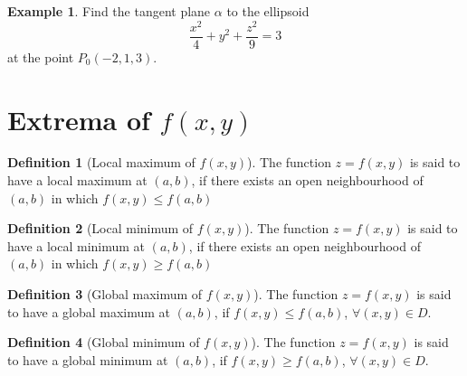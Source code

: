 \documentclass[fleqn, a4paper, 12pt]{article}
\theoremstyle{definition}
\newtheorem{example}{Example}
\newtheorem{definition}{Definition}
\theoremstyle{theorem}
\theoremstyle{remark}
\begin{document}
\begin{example}
	Find the tangent plane $\alpha$ to the ellipsoid 
	\begin{equation*}
		\dfrac{x^2}{4} + y^2 + \dfrac{z^2}{9} = 3
	\end{equation*}
	at the point $P_0 (-2, 1, 3)$.
\end{example}

\section{Extrema of $f(x, y)$}

\begin{definition}[Local maximum of $f(x, y)$]
	The function $z = f(x, y)$ is said to have a local maximum at $(a, b)$, if there exists an open neighbourhood of $(a, b)$ in which $f(x, y) \leq f(a, b)$
\end{definition}

\begin{definition}[Local minimum of $f(x, y)$]
	The function $z = f(x, y)$ is said to have a local minimum at $(a, b)$, if there exists an open neighbourhood of $(a, b)$ in which $f(x, y) \geq f(a, b)$
\end{definition}

\begin{definition}[Global maximum of $f(x, y)$]
	The function $z = f(x, y)$ is said to have a global maximum at $(a, b)$, if $f(x, y) \leq f(a, b)$, $\forall (x, y) \in D$. 
\end{definition}

\begin{definition}[Global minimum of $f(x, y)$]
	The function $z = f(x, y)$ is said to have a global minimum at $(a, b)$, if $f(x, y) \geq f(a, b)$, $\forall (x, y) \in D$. 
\end{definition}
\end{document}
